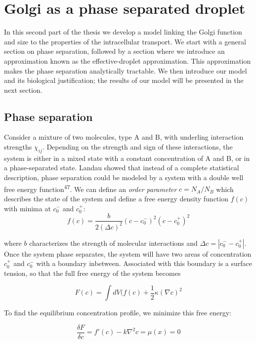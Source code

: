 \documentclass{Dissertate}
\begin{document}
\hypertarget{Golgi-as-a-phase-separated-droplet}{%
\chapter{Golgi as a phase separated
droplet}\label{Golgi-as-a-phase-separated-droplet}}

In this second part of the thesis we develop a model linking the Golgi
function and size to the properties of the intracellular transport. We
start with a general section on phase separation, followed by a section
where we introduce an approximation known as the
effective-droplet approximation. This approximation makes the phase separation analytically tractable. We then introduce our model and its biological justification; the results of our model will be presented in the next section.

\hypertarget{phase-separation}{%
\section{Phase separation}\label{phase-separation}}

Consider a mixture of two molecules, type A and B, with underling
interaction strengths \(\chi_{ij}\). Depending on the strength and sign
of these interactions, the system is either in a mixed state with a
constant concentration of A and B, or in a phase-separated state. Landau
showed that instead of a complete statistical description, phase
separation could be modeled by a system with a double well free energy
function\textsuperscript{47}. We can define an \emph{order parameter}
\(c=N_A/N_B\) which describes the state of the system and define a free
energy density function \(f(c)\) with minima at \(c_0^-\) and \(c_0^+\):
\[
f(c) = \frac{b}{2(\Delta c)^2}(c-c_0^-)^2(c-c_0^+)^2
\]

where \(b\) characterizes the strength of molecular interactions and
\(\Delta c = |c_0^--c_0^+|\). Once the system phase separates, the
system will have two areas of concentration \(c_0^+\) and \(c_0^-\) with
a boundary inbetween. Associated with this boundary is a surface
tension, so that the full free energy of the system becomes

\[
F(c) = \int dV (f(c)+\frac{1}{2}\kappa (\nabla c)^2
\]

To find the equilibrium concentration profile, we minimize this free
energy:

\begin{equation}
\frac{\delta F}{\delta c} = f'(c)-k\nabla^2c=\mu(x) =0
\label{eq:euler}\end{equation}
\end{document}
